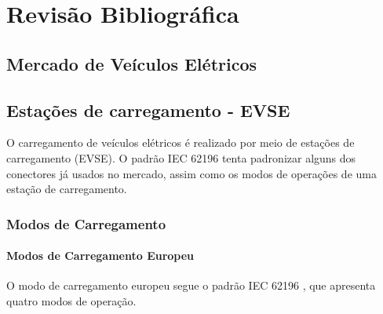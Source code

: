\chapter{Revisão Bibliográfica}

  \section{Mercado de Veículos Elétricos}

  \section{Estações de carregamento - \ac{EVSE}}

    O carregamento de veículos elétricos é realizado por meio de estações de carregamento (\ac{EVSE}). O padrão IEC 62196 \cite{iec-62196} tenta padronizar alguns dos conectores já usados no mercado, assim como os modos de operações de uma estação de carregamento.

    \subsection{Modos de Carregamento}

      \subsubsection{Modos de Carregamento Europeu}

        O modo de carregamento europeu segue o padrão IEC 62196 \cite{iec-62196}, que apresenta quatro modos de operação.

